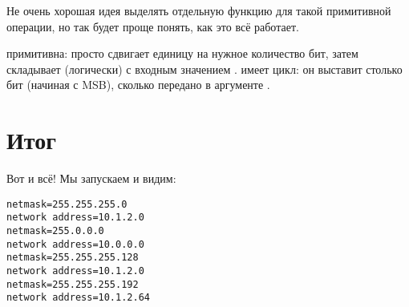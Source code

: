 Не очень хорошая идея выделять отдельную функцию для такой примитивной операции, но так будет проще понять,
как это всё работает.



 примитивна: просто сдвигает единицу на нужное количество бит, затем складывает (логически) с
входным значением .
 имеет цикл: он выставит столько бит (начиная с \ac{MSB}), 
сколько передано в аргументе .

\section{Итог}

Вот и всё!
Мы запускаем и видим:

\begin{lstlisting}
netmask=255.255.255.0
network address=10.1.2.0
netmask=255.0.0.0
network address=10.0.0.0
netmask=255.255.255.128
network address=10.1.2.0
netmask=255.255.255.192
network address=10.1.2.64
\end{lstlisting}

